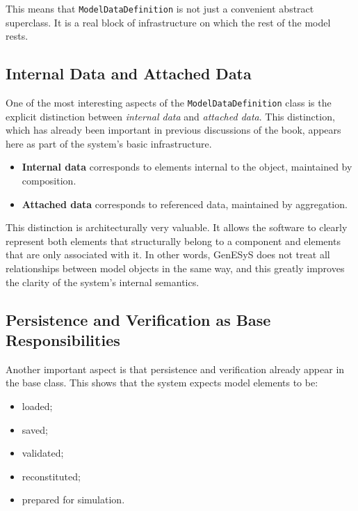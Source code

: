 This means that \texttt{ModelDataDefinition} is not just a convenient abstract superclass. It is a real block of infrastructure on which the rest of the model rests.

\subsection{Internal Data and Attached Data}
\label{subsec:cap8_internal_attached_data}

One of the most interesting aspects of the \texttt{ModelDataDefinition} class is the explicit distinction between \textit{internal data} and \textit{attached data}. This distinction, which has already been important in previous discussions of the book, appears here as part of the system's basic infrastructure.

\begin{itemize}
 \item \textbf{Internal data} corresponds to elements internal to the object, maintained by composition.
 \item \textbf{Attached data} corresponds to referenced data, maintained by aggregation.
\end{itemize}

This distinction is architecturally very valuable. It allows the software to clearly represent both elements that structurally belong to a component and elements that are only associated with it. In other words, GenESyS does not treat all relationships between model objects in the same way, and this greatly improves the clarity of the system's internal semantics.

\subsection{Persistence and Verification as Base Responsibilities}
\label{subsec:cap8_persistencia_verificacao_base}

Another important aspect is that persistence and verification already appear in the base class. This shows that the system expects model elements to be:
\begin{itemize}
 \item loaded;
 \item saved;
 \item validated;
 \item reconstituted;
 \item prepared for simulation.
\end{itemize}

